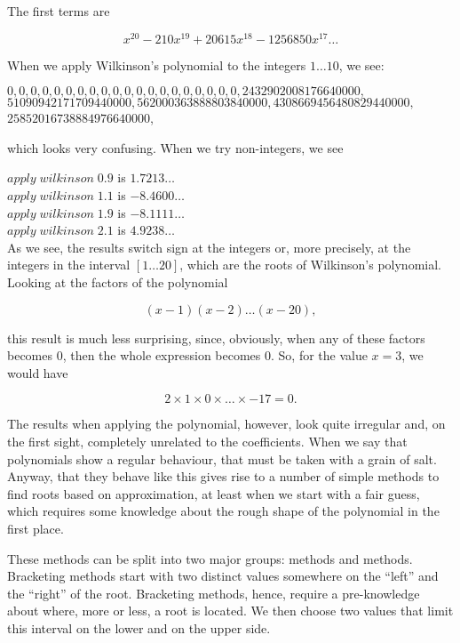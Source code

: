 \documentclass[tikz]{scrreprt}
\newcommand{\Varid}[1]{\mathit{#1}}
\begin{document}
The first terms are

\[
x^{20} - 210x^{19} + 20615x^{18} - 1256850x^{17} \dots
\]

When we apply Wilkinson's polynomial to the integers $1\dots 10$, we see:

\ensuremath{\mathrm{0},\mathrm{0},\mathrm{0},\mathrm{0},\mathrm{0},\mathrm{0},\mathrm{0},\mathrm{0},\mathrm{0},\mathrm{0},\mathrm{0},\mathrm{0},\mathrm{0},\mathrm{0},\mathrm{0},\mathrm{0},\mathrm{0},\mathrm{0},\mathrm{0},\mathrm{0},\mathrm{2432902008176640000},}\\
\ensuremath{\mathrm{51090942171709440000},\mathrm{562000363888803840000},\mathrm{4308669456480829440000},}\\
\ensuremath{\mathrm{25852016738884976640000}},

which looks very confusing. When we try non-integers, we see

\ensuremath{\Varid{apply}\;\Varid{wilkinson}\;\mathrm{0.9}} is $1.7213\dots$\\
\ensuremath{\Varid{apply}\;\Varid{wilkinson}\;\mathrm{1.1}} is $-8.4600\dots$\\
\ensuremath{\Varid{apply}\;\Varid{wilkinson}\;\mathrm{1.9}} is $-8.1111\dots$\\
\ensuremath{\Varid{apply}\;\Varid{wilkinson}\;\mathrm{2.1}} is $4.9238\dots$\\

As we see, the results switch sign at the integers or,
more precisely, at the integers in the interval $[1\dots 20]$,
which are the roots of Wilkinson's polynomial.
Looking at the factors of the polynomial

\[
(x-1)(x-2)\dots (x-20),
\]

this result is much less surprising, since, obviously,
when any of these factors becomes 0, then the whole
expression becomes 0. So, for the value $x=3$, we would have

\[
2 \times 1 \times 0 \times \dots \times -17 = 0.
\]

The results when applying the polynomial, however,
look quite irregular and, on the first sight,
completely unrelated to the coefficients.
When we say that polynomials show a regular behaviour,
that must be taken with a grain of salt.
Anyway, that they behave like this 
gives rise to a number of simple
methods to find roots based on approximation,
at least when we start with a fair guess,
which requires some knowledge about the rough shape
of the polynomial in the first place.

These methods can be split into two major groups:
 methods and  methods.
Bracketing methods start with two distinct values
somewhere on the ``left'' and the ``right'' of
the root. Bracketing methods, hence, require a
pre-knowledge about where, more or less, a root
is located. We then choose two values that limit
this interval on the lower and on the upper side.
\end{document}
